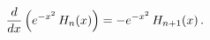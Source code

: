\[\frac{d}{dx}\left(e^{-x^{2}}\mathop{H_{n}\/}\nolimits\!\left(x\right)\right)=-%
e^{-x^{2}}\mathop{H_{n+1}\/}\nolimits\!\left(x\right).\]